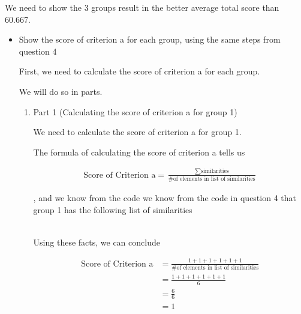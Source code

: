 \documentclass[12pt]{article}
\begin{document}
\begin{mdframed}
    \bigskip

    We need to show the 3 groups result in the better average total score
    than 60.667.

    \bigskip

    \begin{itemize}
        \item Show the score of criterion a for each group, using the same steps from
        question 4

        First, we need to calculate the score of criterion a for each group.

        \bigskip

        We will do so in parts.

        \begin{enumerate}[1.]
            \item Part 1 (Calculating the score of criterion a for group 1)
            \begin{mdframed}

                We need to calculate the score of criterion a for group 1.

                \bigskip

                The formula of calculating the score of criterion a tells us

                \begin{align}
                    \text{Score of Criterion a} = \frac{\sum \text{similarities}}{\text{\# of elements in list of similarities}}
                \end{align}

                , and we know from the code we know from the code in question 4 that group 1 has the following
                list of similarities

                \begin{align}
                    [1,1,1,1,1,1]
                \end{align}

                \bigskip

                Using these facts, we can conclude

                \begin{align}
                    \text{Score of Criterion a} &= \frac{1 + 1 + 1 + 1 + 1 + 1}{\text{\# of elements in list of similarities}}\\
                    &= \frac{1 + 1 + 1 + 1 + 1 + 1}{6}\\
                    &= \frac{6}{6}\\
                    &= 1
                \end{align}


\end{mdframed}
\end{enumerate}
\end{itemize}
\end{mdframed}
\end{document}
